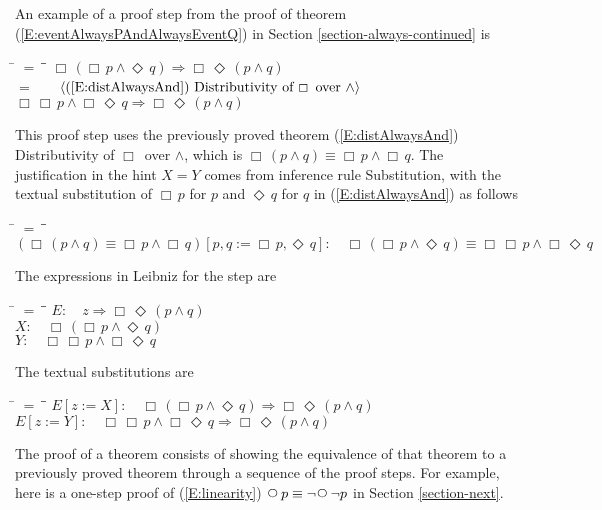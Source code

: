 \documentclass[12pt, fleqn, leqno]{article}
\newcommand{\lgap}{2pt}                             %
\newcommand{\mymathindent}{24pt}                    %
\newcommand{\impl}{\ensuremath{\Rightarrow}}        %
\newcommand{\Next}{\;\,\text{\raisebox{3.5pt}{\circle{6}}}}
\newcommand{\Event}{\Diamond\,}
\newcommand{\Always}{\Box\,}
\newcommand{\myqedtab}{\hspace{384pt}}              %
\newcommand{\Gll} {\langle}                         %
\newcommand{\Ggg} {\rangle}                         %
\newcommand{\Hint}[1]     {\ \ \ $\Gll              \mbox{#1} \Ggg$ }   %
\begin{document}
An example of a proof step from the proof of theorem (\ref{E:eventAlwaysPAndAlwaysEventQ}) in Section \ref{section-always-continued} is
\begin{tabbing}
\hspace{\mymathindent} \= $= \;$ \= \myqedtab \= \kill
\> \>   $\Always (\Always p \land \Event q) \impl \Always\Event (p \land q)$\\[\lgap]
\> $=$  \>  \Hint{(\ref{E:distAlwaysAnd}) Distributivity of $\Always$ over $\land$}\\[\lgap]
\> \>   $\Always \Always p \land \Always\Event q \impl \Always\Event (p \land q)$
\end{tabbing}
This proof step uses the previously proved theorem (\ref{E:distAlwaysAnd}) Distributivity of $\Always$ over $\land$,
which is $\Always (p \land q) \equiv \Always p \land \Always q$.
The justification in the hint $X=Y$ comes from inference rule Substitution, with the textual substitution of $\Always p$ for $p$ and $\Event q$ for $q$ in (\ref{E:distAlwaysAnd}) as follows
\begin{tabbing}
\hspace{\mymathindent} \= $= \;$ \= \myqedtab \= \kill
  \> $(\Always (p \land q) \equiv \Always p \land \Always q)[p,q:=\Always p, \Event q]:\quad \Always (\Always p \land \Event q) \equiv \Always \Always p \land \Always \Event q$
\end{tabbing}
The expressions in Leibniz for the step are
\begin{tabbing}
\hspace{\mymathindent} \= $= \;$ \= \myqedtab \= \kill
  \> $E:\quad z \impl \Always\Event (p \land q)$\\[\lgap]
  \> $X:\quad \Always (\Always p \land \Event q)$\\[\lgap]
  \> $Y:\quad \Always \Always p \land \Always \Event q$
\end{tabbing}
The textual substitutions are
\begin{tabbing}
\hspace{\mymathindent} \= $= \;$ \= \myqedtab \= \kill
  \> $E[z:=X]:\quad \Always (\Always p \land \Event q) \impl \Always\Event (p \land q)$\\[\lgap]
  \> $E[z:=Y]:\quad \Always \Always p \land \Always\Event q \impl \Always\Event (p \land q)$
\end{tabbing}

The proof of a theorem consists of showing the equivalence of that theorem to a previously proved theorem
through a sequence of the proof steps.
For example, here is a one-step proof of (\ref{E:linearity}) $\Next p \equiv \neg\Next\neg p$ in Section \ref{section-next}.
\end{document}
